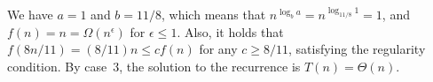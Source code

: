 We have $a=1$ and $b=11/8$, which means that $n^{\log_ba}=n^{\log_{11/8}1}=1$, and $f(n)=n=\Omega(n^\epsilon)$ for $\epsilon\le1$.
Also, it holds that $f(8n/11)=(8/11)n\le cf(n)$ for any $c\ge8/11$, satisfying the regularity condition.
By case~3, the solution to the recurrence is $T(n)=\Theta(n)$.
